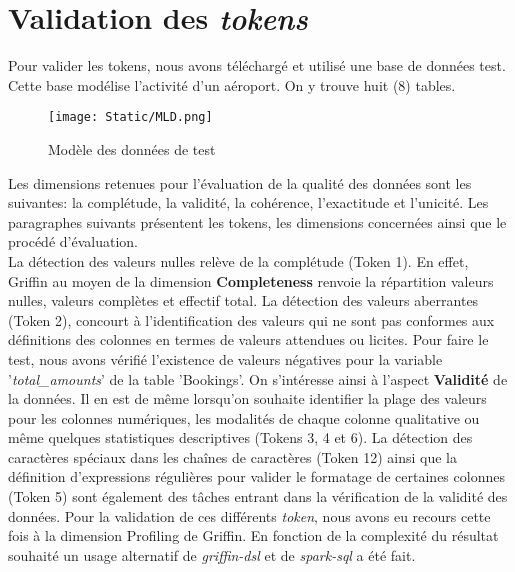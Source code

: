 
\section{Validation des \textit{tokens}}
Pour valider les tokens, nous avons t\'el\'echarg\'e et utilis\'e une base de donn\'ees test. Cette base mod\'elise l'activit\'e d'un a\'eroport. On y trouve huit (8) tables. \\
\begin{figure}[H]
 \caption{Mod\`ele des donn\'ees de test}  \label{fig:xray}
    \begin{center}
      \texttt{[image: Static/MLD.png]} 
    \end{center}
\end{figure}
Les dimensions retenues pour l'\'evaluation de la qualit\'e des donn\'ees sont les suivantes: la compl\'etude, la validit\'e, la coh\'erence, l'exactitude et l'unicit\'e. Les paragraphes suivants pr\'esentent les tokens, les dimensions concern\'ees ainsi que le proc\'ed\'e d'\'evaluation.
\\

La d\'etection des valeurs nulles rel\`eve de la compl\'etude (Token 1). En effet, Griffin au moyen de la dimension \textbf{Completeness} renvoie la r\'epartition valeurs nulles, valeurs compl\`etes et effectif total.  La d\'etection des valeurs aberrantes (Token 2), concourt \`a l'identification des valeurs qui ne sont pas conformes aux d\'efinitions des colonnes en termes de valeurs attendues ou licites. Pour faire le test, nous avons v\'erifi\'e l'existence de valeurs n\'egatives pour la variable '\textit{total\_amounts}'  de la table 'Bookings'. On s'intéresse ainsi \`a l'aspect \textbf{Validit\'e} de la donn\'ees. Il en est de m\^eme lorsqu'on souhaite identifier la plage des valeurs pour les colonnes num\'eriques, les modalit\'es de chaque colonne qualitative ou m\^eme quelques statistiques descriptives (Tokens 3, 4 et 6). La d\'etection des caract\`eres sp\'eciaux dans les cha\^ines de caract\`eres (Token 12) ainsi que la d\'efinition d'expressions r\'eguli\`eres  pour valider le formatage de certaines colonnes (Token 5) sont \'egalement des t\^aches entrant dans la v\'erification de la validit\'e des donn\'ees. Pour la validation de ces diff\'erents \textit{token}, nous avons eu recours cette fois \`a la dimension Profiling de Griffin. En fonction de la complexit\'e du r\'esultat souhait\'e un usage alternatif de \emph{griffin-dsl} et de \emph{spark-sql} a \'et\'e fait.
\\

